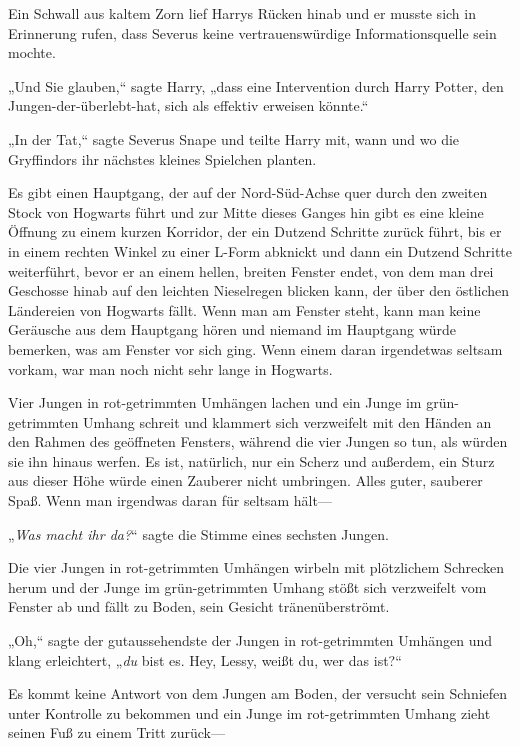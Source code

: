 {Ein Schwall aus kaltem Zorn lief Harrys Rücken hinab und er musste sich in Erinnerung rufen, dass Severus keine vertrauenswürdige Informationsquelle sein mochte.

„Und Sie glauben,“ sagte Harry, „dass eine Intervention durch Harry Potter, den Jungen-der-überlebt-hat, sich als effektiv erweisen könnte.“

„In der Tat,“ sagte Severus Snape und teilte Harry mit, wann und wo die Gryffindors ihr nächstes kleines Spielchen planten.

\later

Es gibt einen Hauptgang, der auf der Nord-Süd-Achse quer durch den zweiten Stock von Hogwarts führt und zur Mitte dieses Ganges hin gibt es eine kleine Öffnung zu einem kurzen Korridor, der ein Dutzend Schritte zurück führt, bis er in einem rechten Winkel zu einer L-Form abknickt und dann ein Dutzend Schritte weiterführt, bevor er an einem hellen, breiten Fenster endet, von dem man drei Geschosse hinab auf den leichten Nieselregen blicken kann, der über den östlichen Ländereien von Hogwarts fällt. Wenn man am Fenster steht, kann man keine Geräusche aus dem Hauptgang hören und niemand im Hauptgang würde bemerken, was am Fenster vor sich ging. Wenn einem daran irgendetwas seltsam vorkam, war man noch nicht sehr lange in Hogwarts.

Vier Jungen in rot-getrimmten Umhängen lachen und ein Junge im grün-getrimmten Umhang schreit und klammert sich verzweifelt mit den Händen an den Rahmen des geöffneten Fensters, während die vier Jungen so tun, als würden sie ihn hinaus werfen. Es ist, natürlich, nur ein Scherz und außerdem, ein Sturz aus dieser Höhe würde einen Zauberer nicht umbringen. Alles guter, sauberer Spaß. Wenn man irgendwas daran für seltsam hält—

„\emph{Was macht ihr da?}“ sagte die Stimme eines sechsten Jungen.

Die vier Jungen in rot-getrimmten Umhängen wirbeln mit plötzlichem Schrecken herum und der Junge im grün-getrimmten Umhang stößt sich verzweifelt vom Fenster ab und fällt zu Boden, sein Gesicht tränenüberströmt.

„Oh,“ sagte der gutaussehendste der Jungen in rot-getrimmten Umhängen und klang erleichtert, „\emph{du} bist es. Hey, Lessy, weißt du, wer das ist?“

Es kommt keine Antwort von dem Jungen am Boden, der versucht sein Schniefen unter Kontrolle zu bekommen und ein Junge im rot-getrimmten Umhang zieht seinen Fuß zu einem Tritt zurück—

}
